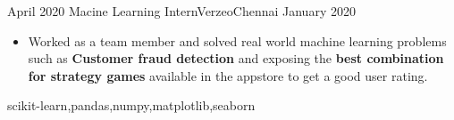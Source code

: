%
%
%
\begin{experiences}
  \experience
    {April 2020} {Macine Learning Intern}{Verzeo}{Chennai}
    {January 2020}    {
                      \begin{itemize}
                        \item Worked as a team member and solved real world machine learning problems such as \textbf{Customer fraud detection} and exposing the \textbf{best combination for strategy games} available in the appstore to get a good user rating.                     
                      \end{itemize}
                    }
                    {scikit-learn,pandas,numpy,matplotlib,seaborn}
  
\end{experiences}